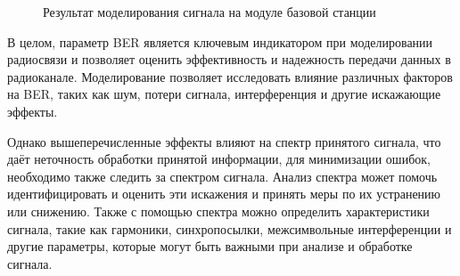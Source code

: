 \begin{figure}[h]
		\begin{minipage}[h]{0.49\linewidth}
		\end{minipage}
		\hfill
		\begin{minipage}[h]{0.49\linewidth}
		\end{minipage}
		\caption{Результат моделирования сигнала на модуле базовой станции}
		\label{fig:model21}
	\end{figure}


\begin{onehalfspace}
В целом, параметр BER является ключевым индикатором при моделировании радиосвязи и позволяет оценить эффективность и надежность передачи данных в радиоканале. Моделирование позволяет исследовать влияние различных факторов на BER, таких как шум, потери сигнала, интерференция и другие искажающие эффекты. 


Однако вышеперечисленные эффекты влияют на спектр принятого сигнала, что даёт неточность обработки принятой информации, для минимизации ошибок, необходимо также следить за спектром сигнала. Анализ спектра может помочь идентифицировать и оценить эти искажения и принять меры по их устранению или снижению. Также с помощью спектра можно определить характеристики сигнала, такие как гармоники, синхропосылки, межсимвольные интерференции и другие параметры, которые могут быть важными при анализе и обработке сигнала.

\end{onehalfspace}



